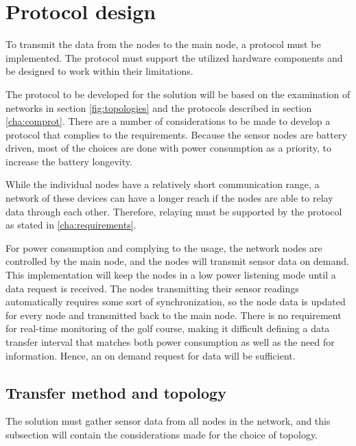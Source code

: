 \section{Protocol design}\label{cha:protocolDesign}
To transmit the data from the nodes to the main node, a protocol must be implemented.
The protocol must support the utilized hardware components and be designed to work within their limitations. 

The protocol to be developed for the solution will be based on the examination of networks in section \ref{fig:topologies} and the protocols described in section \ref{cha:comprot}.
There are a number of considerations to be made to develop a protocol that complies to the requirements.
Because the sensor nodes are battery driven, most of the choices are done with power consumption as a priority, to increase the battery longevity.

While the individual nodes have a relatively short communication range, a network of these devices can have a longer reach if the nodes are able to relay data through each other.
Therefore, relaying must be supported by the protocol as stated in \ref{cha:requirements}. 

For power consumption and complying to the usage, the network nodes are controlled by the main node, and the nodes will transmit sensor data on demand.
This implementation will keep the nodes in a low power listening mode until a data request is received.
The nodes transmitting their sensor readings automatically requires some sort of synchronization, so the node data is updated for every node and transmitted back to the main node.
There is no requirement for real-time monitoring of the golf course, making it difficult defining a data transfer interval that matches both power consumption as well as the need for information.
Hence, an on demand request for data will be sufficient.

\subsection{Transfer method and topology}
The solution must gather sensor data from all nodes in the network, and this subsection will contain the considerations made for the choice of topology.

